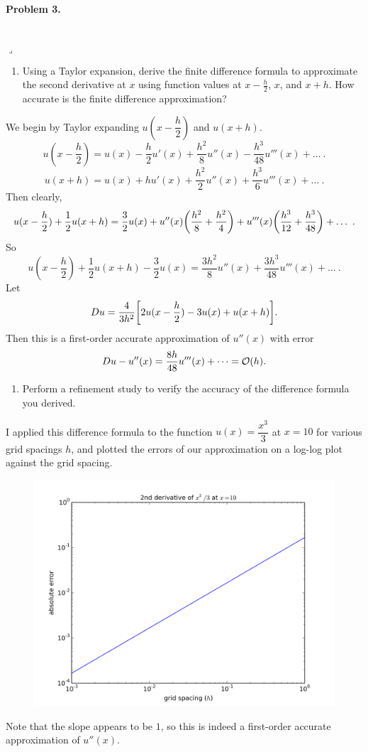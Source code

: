 \documentclass[12pt]{article}
\newenvironment{myprob}[1]
    {%
    \noindent{\Huge$\ulcorner$}\textbf{#1.}\begin{em}
    }
    { 
    \end{em} \\ \hphantom{l} \hfill {\Huge$\lrcorner$} }
\begin{document}
\begin{myprob}{Problem 3}
\end{myprob}
\begin{enumerate}[ \ \ (a)]
\item Using a Taylor expansion, derive the finite difference formula to approximate the second derivative at $x$ using function values at $x - \frac{h}{2}$, $x$, and $x + h$.  How accurate is the finite difference approximation?
\end{enumerate}

We begin by Taylor expanding $u(x-\dfrac{h}{2})$ and $u(x+h)$.
$$u(x-\dfrac{h}{2}) = u(x) - \dfrac{h}{2}u'(x) + \dfrac{h^2}{8}u''(x) -\dfrac{h^3}{48} u'''(x) + \dots \ .$$
$$u(x+h) = u(x) + h u'(x) + \dfrac{h^2}{2} u''(x) + \dfrac{h^3}{6}u'''(x)+\dots \ .$$
Then clearly, 
$$u(x-\dfrac{h}{2}) + \dfrac{1}{2}u(x+h) = \dfrac{3}{2}u(x)  + u''(x)\qty(\dfrac{h^2}{8}+\dfrac{h^2}{4}) +u'''(x)\qty(\dfrac{h^3}{12} + \dfrac{h^3}{48}) + \dots \ .$$
So $$u(x-\dfrac{h}{2}) + \dfrac{1}{2}u(x+h)  - \dfrac{3}{2}u(x) = \dfrac{3h^2}{8}u''(x) + \dfrac{3h^3}{48}u'''(x)+ \dots \ .$$
Let $$Du = \dfrac{4}{3h^2}\qty[2 u(x-\dfrac{h}{2}) - 3u(x) + u(x+h)].$$
Then this is a first-order accurate approximation of $u''(x)$ with error $$Du - u''(x) = \dfrac{8h}{48}u'''(x) + \dots = \order{h}.$$
\begin{enumerate}[ \ \ (b)]
    \item Perform a refinement study to verify the accuracy of the difference formula you derived.
    \end{enumerate}

I applied this difference formula to the function $u(x) = \dfrac{x^3}{3}$ at $x=10$ for various grid spacings $h$, and plotted the errors of our approximation on a log-log plot against the grid spacing.
\begin{figure}[H]
\centering\includegraphics[scale=0.75]{problem3_refinement_study.png}
\end{figure}
Note that the slope appears to be $1$, so this is indeed a first-order accurate approximation of $u''(x)$.
\end{document}
